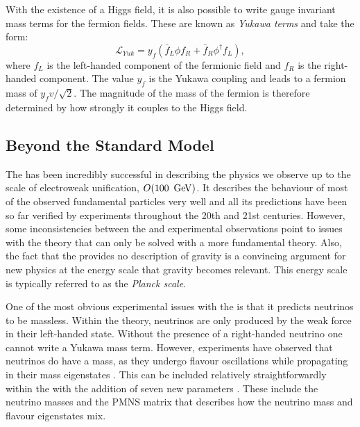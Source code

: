 With the existence of a Higgs field, it is also possible to write
gauge invariant mass terms for the fermion fields. These are known as
\emph{Yukawa terms} and take the form:
\begin{equation}
  \mathcal{L}_{Yuk}=y_{f}\left(\bar{f}_{L}\phi f_{R}+\bar{f}_{R}\phi^{\dag}f_{L}\right),
\end{equation}
where $f_L$ is the left-handed component of the fermionic field and
$f_R$ is the right-handed component. The value $y_f$ is the Yukawa
coupling and leads to a fermion mass of $y_fv/\sqrt{2}$. The magnitude
of the mass of the fermion is therefore determined by how strongly it
couples to the Higgs field.

\subsection{Beyond the Standard Model}
\label{sec:bsm}

The \SM has been incredibly successful in describing the physics we
observe up to the scale of electroweak unification, $O(100~\mathrm{\,Ge\kern -0.1em V})$. It
describes the behaviour of most of the observed fundamental
particles very well and all its predictions have been so far verified by
experiments throughout the 20th and 21st centuries. However,
some inconsistencies between the \SM and experimental observations point to issues
with the theory that can only be solved with a more fundamental \BSM
theory. Also, the fact that the \SM provides no description of
gravity is a convincing argument for new physics at the energy scale
that gravity becomes relevant. This energy scale is typically referred
to as the \emph{Planck scale}.

One of the most obvious experimental issues with the \SM is that it
predicts neutrinos to be massless. Within the theory, neutrinos are
only produced by the weak force in their left-handed state. Without
the presence of a right-handed neutrino one cannot write a Yukawa mass
term. However, experiments have observed that neutrinos do 
have a mass, as they undergo flavour oscillations while propagating in
their mass eigenstates \cite{PhysRevLett.87.071301,Fukuda:1998mi}.
This can be included relatively straightforwardly within the
\SM with the addition of seven new parameters
\cite{doi:10.1143/PTP.28.870}.  These include the neutrino masses and
the \ac{PMNS} matrix that describes how the neutrino mass and flavour
eigenstates mix.

